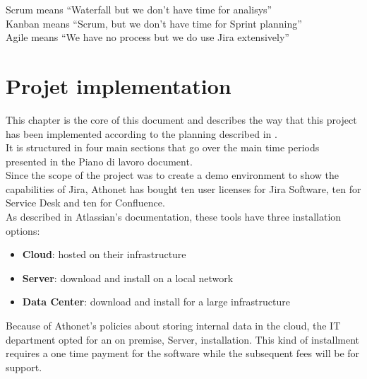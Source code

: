 \begin{savequote}[90mm]
	Scrum means ``Waterfall but we don't have time for analisys''\\
	Kanban means ``Scrum, but we don't have time for Sprint planning''\\
	Agile means ``We have no process but we do use Jira extensively''
\end{savequote}

\chapter{Projet implementation}
\label{chapter_5}
	This chapter is the core of this document and describes the way that this project has been implemented according to the planning described in .\\
	It is structured in four main sections that go over the main time periods presented in the Piano di lavoro document.\\
	Since the scope of the project was to create a demo environment to show the capabilities of Jira, Athonet has bought ten user licenses for Jira Software, ten for Service Desk and ten for Confluence.\\
	As described in Atlassian's documentation\cite{compare-atlassian-cloud-vs-server}, these tools have three installation options:
	\begin{itemize}
		\item \textbf{Cloud}: hosted on their infrastructure
		\item \textbf{Server}: download and install on a local network
		\item \textbf{Data Center}: download and install for a large infrastructure
	\end{itemize}
	Because of Athonet's policies about storing internal data in the cloud, the IT department opted for an on premise, Server, installation.
	This kind of installment requires a one time payment for the software while the subsequent fees will be for support.
